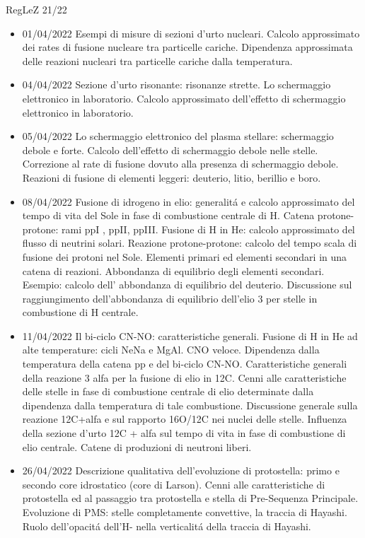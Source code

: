 \begin{frame}[allowframebreaks]{RegLeZ 21/22}
\begin{itemize}
\item 01/04/2022 Esempi di misure di sezioni d'urto nucleari. Calcolo approssimato dei rates di fusione nucleare tra particelle cariche. Dipendenza approssimata delle reazioni nucleari tra particelle cariche dalla temperatura.
\item 04/04/2022 Sezione d'urto risonante: risonanze strette. Lo schermaggio elettronico in laboratorio. Calcolo approssimato dell'effetto di schermaggio elettronico in laboratorio.
\item 05/04/2022 Lo schermaggio elettronico del plasma stellare: schermaggio debole e forte. Calcolo dell'effetto di schermaggio debole nelle stelle. Correzione al rate di fusione dovuto alla presenza di schermaggio debole. Reazioni di fusione di elementi leggeri: deuterio, litio, berillio e boro.
\item 08/04/2022 Fusione di idrogeno in elio: generalit\'a e calcolo approssimato del tempo di vita del Sole in fase di combustione centrale di H. Catena protone-protone: rami ppI , ppII, ppIII. Fusione di H in He: calcolo approssimato del flusso di neutrini solari. Reazione protone-protone: calcolo del tempo scala di fusione dei protoni nel Sole. Elementi primari ed elementi secondari in una catena di reazioni. Abbondanza di equilibrio degli elementi secondari. Esempio: calcolo dell' abbondanza di equilibrio del deuterio. Discussione sul raggiungimento dell'abbondanza di equilibrio dell'elio 3 per stelle in combustione di H centrale.
\item 11/04/2022 Il bi-ciclo CN-NO: caratteristiche generali. Fusione di H in He ad alte temperature: cicli NeNa e MgAl. CNO veloce. Dipendenza dalla temperatura della catena pp e del bi-ciclo CN-NO. Caratteristiche generali della reazione 3 alfa per la fusione di elio in 12C. Cenni alle caratteristiche delle stelle in fase di combustione centrale di elio determinate dalla dipendenza dalla temperatura di tale combustione. Discussione generale sulla reazione 12C+alfa e sul rapporto 16O/12C nei nuclei delle stelle. Influenza della sezione d'urto 12C + alfa sul tempo di vita in fase di combustione di elio centrale. Catene di produzioni di neutroni liberi. 
\item 26/04/2022 Descrizione qualitativa dell'evoluzione di protostella: primo e secondo core idrostatico (core di Larson). Cenni alle caratteristiche di protostella ed al passaggio tra protostella e stella di Pre-Sequenza Principale. Evoluzione di PMS: stelle completamente convettive, la traccia di Hayashi. Ruolo dell'opacit\'a dell'H- nella verticalit\'a della traccia di Hayashi.

\end{itemize}
\end{frame}
